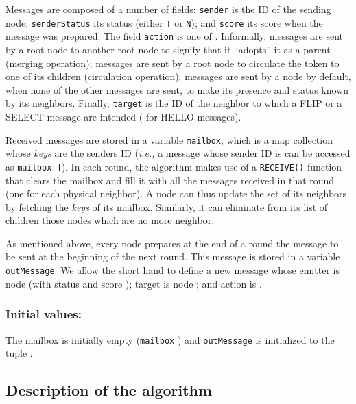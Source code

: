 \documentclass[twocolumn]{article}
\begin{document}
Messages are composed of a number of fields: {\tt sender} is the ID of
the sending node; {\tt senderStatus} its status (either {\tt T} or
{\tt N}); and {\tt score} its score when the message was prepared. The
field {\tt action} is one of . Informally,
 messages are sent by a root node to another root node to
signify that it ``adopts'' it as a parent (merging operation); 
messages are sent by a root node to circulate the token to one of its
children (circulation operation);  messages are sent by a node
by default, when none of the other messages are sent, to make its
presence and status known by its neighbors. Finally, {\tt target} is
the ID of the neighbor to which a FLIP or a SELECT message are
intended ( for HELLO messages).

Received messages are stored in a variable \texttt{mailbox}, which is
a map collection whose {\em keys} are the senders ID ({\it i.e.,} a
message whose sender ID is  can be accessed as {\tt mailbox[]}).
In each round, the algorithm makes use of a {\tt RECEIVE()} function
that clears the mailbox and fill it with all the messages received in
that round (one for each physical neighbor). A node can thus update
the set of its neighbors by fetching the {\em keys} of its mailbox.
Similarly, it can eliminate from its list of children those nodes which
are no more neighbor.

As mentioned above, every node prepares at the end of a round the message to
be sent at the beginning of the next round. This message is stored in
a variable \texttt{outMessage}. We allow the short hand  to define a new message  whose emitter is node  (with status  and score ); target is node ; and action is .


\subsubsection{Initial values:} The mailbox is initially empty ({\tt mailbox} ) and \texttt{outMessage} is initialized to the tuple .

\subsection{Description of the algorithm}
\end{document}
